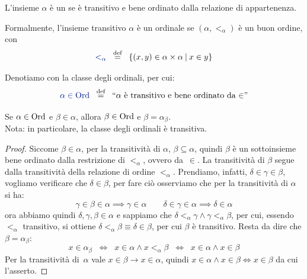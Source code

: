 \begin{definition}
	L'insieme $\alpha$ \`e un  se \`e {\drkred
transitivo e bene ordinato dalla relazione di appartenenza.}

Formalmente, l'insieme transitivo $\alpha$
	\`e un ordinale se $(\alpha, <_\alpha)$ \`e un buon ordine, con
	\[ {\drkblu <_\alpha} \;\;\Mydef\;\; \{(x,y) \in \alpha \times \alpha \:|\: x \in y\}
		\]

	Denotiamo con \vocab{$\Ord$} la classe degli ordinali, per cui:
	\[ {\drkblu \alpha \in \Ord} \;\;\Mydef\;\; \text{``$\alpha$ \`e transitivo
e bene ordinato da $\in$''}
		\]
\end{definition}


\begin{remark}
	\label{Ord_trans}
	Se $\alpha \in \operatorname{Ord}$ e $\beta \in \alpha$, allora $\beta \in \operatorname{Ord}$
e $\beta = \alpha_\beta$.\\
	{\drkgrn Nota: in particolare, la classe degli ordinali \`e
transitiva.}
\end{remark}

\begin{proof}
	Siccome $\beta \in \alpha$, per la transitivit\`a di $\alpha$,
$\beta \subseteq \alpha$, quindi $\beta$ \`e un sottoinsieme bene ordinato
dalla restrizione di $<_\alpha$, ovvero da~$\in$.
	La transitivit\`a di $\beta$ segue dalla transitivit\`a della relazione di ordine $<_{\alpha}$. Prendiamo, infatti, $\delta \in \gamma \in \beta$, vogliamo verificare che $\delta \in \beta$, per fare ci\`o osserviamo che per la transitivit\`a di $\alpha$ si ha:
	\[ \gamma \in \beta \in \alpha \implies \gamma \in \alpha \qquad \delta \in \gamma \in \alpha \implies \delta \in \alpha
		\]
	ora abbiamo quindi $\delta,\gamma,\beta \in \alpha$ e sappiamo che $\delta <_\alpha \gamma \land \gamma <_\alpha \beta$, per cui, essendo $<_\alpha$ transitivo, si ottiene $\delta <_\alpha \beta \equiv \delta \in \beta$, per cui $\beta$ \`e transitivo.
	Resta da dire che $\beta = \alpha_\beta$:
	\[ x \in \alpha_\beta \;\;\iff\;\; x \in \alpha \land x <_\alpha
\beta \;\;\iff\;\; x \in \alpha \land x \in \beta
		\]
	Per la transitivit\`a di~$\alpha$ vale $x \in \beta \rightarrow x
\in \alpha$, quindi
	$x \in \alpha \land x \in \beta \iff x \in \beta$ da cui
l'asserto.
\end{proof}

